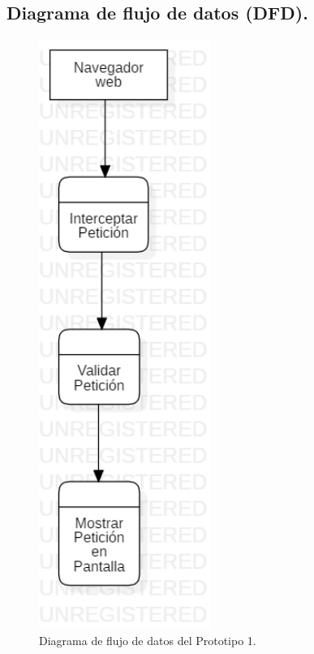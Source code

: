 \documentclass[12pt, a4paper, titlepage]{report}
\begin{document}
    			\subsection{Diagrama de flujo de datos (DFD).}
        			\begin{figure}[H]
        			    \begin{center}
    			        \includegraphics[width=0.5\textwidth]{imagenes/Desarrollo/Prototipo_1/DFD_P1.png}
    			        \caption{Diagrama de flujo de datos del Prototipo 1.}
    				\end{center}
    			\end{figure}
\end{document}
